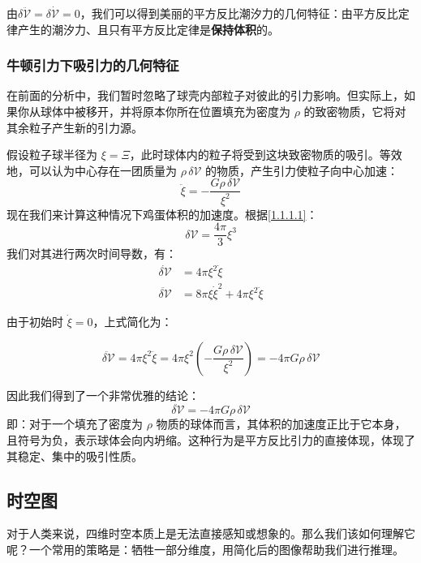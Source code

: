 \documentclass[../Main.tex]{subfiles}
\begin{document}
由$\delta\ddot{\mathcal V}=\delta\dot{\mathcal V}=0$，我们可以得到美丽的平方反比潮汐力的几何特征：由平方反比定律产生的潮汐力、且只有平方反比定律是\textbf{保持体积}的。

\subsubsection{牛顿引力下吸引力的几何特征}

在前面的分析中，我们暂时忽略了球壳内部粒子对彼此的引力影响。但实际上，如果你从球体中被移开，并将原本你所在位置填充为密度为 $\rho$ 的致密物质，它将对其余粒子产生新的引力源。

假设粒子球半径为 $\xi = \Xi$，此时球体内的粒子将受到这块致密物质的吸引。等效地，可以认为中心存在一团质量为 $\rho \, \delta \mathcal{V}$ 的物质，产生引力使粒子向中心加速：
\begin{equation*}
\ddot{\xi} = -\frac{G \rho \, \delta \mathcal{V}}{\xi^2}
\end{equation*}
现在我们来计算这种情况下鸡蛋体积的加速度。根据\eqref{1.1.1.1}：
\begin{equation*}
\delta \mathcal{V} = \frac{4\pi}{3} \xi^3
\end{equation*}
我们对其进行两次时间导数，有：
\begin{align*}
\dot{\delta \mathcal{V}} &= 4\pi \xi^2 \dot{\xi} \\
\ddot{\delta \mathcal{V}} &= 8\pi \xi \dot{\xi}^2 + 4\pi \xi^2 \ddot{\xi}
\end{align*}

由于初始时 $\dot{\xi} = 0$，上式简化为：

\begin{equation*}
\ddot{\delta \mathcal{V}} = 4\pi \xi^2 \ddot{\xi} = 4\pi \xi^2 \left( -\frac{G \rho \, \delta \mathcal{V}}{\xi^2} \right) = -4\pi G \rho \, \delta \mathcal{V}
\end{equation*}

因此我们得到了一个非常优雅的结论：
\begin{equation}
    \ddot{\delta \mathcal{V}} = -4\pi G \rho \, \delta \mathcal{V}
\end{equation}
即：对于一个填充了密度为 $\rho$ 物质的球体而言，其体积的加速度正比于它本身，且符号为负，表示球体会向内坍缩。这种行为是平方反比引力的直接体现，体现了其稳定、集中的吸引性质。
\subsection{时空图}
对于人类来说，四维时空本质上是无法直接感知或想象的。那么我们该如何理解它呢？一个常用的策略是：牺牲一部分维度，用简化后的图像帮助我们进行推理。
\end{document}
